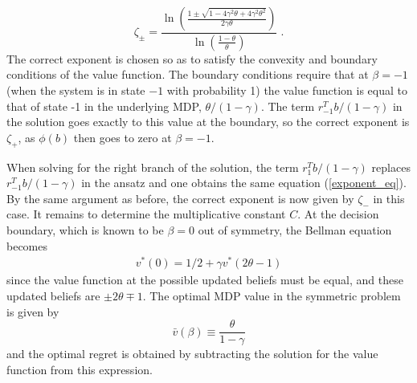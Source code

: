 \documentclass[aps,nofootinbib,groupaddress,superscriptaddress,reprint,amsmath,amssymb,graphicx,onecolumn,prx]{revtex4-2}
\begin{document}
\begin{equation}
    \zeta_{\pm}=\frac{\ln \left( \frac{1 \pm \sqrt{1 - 4\gamma^2\theta + 4\gamma^2\theta^2}}{2\gamma\theta} \right)}
{\ln(\frac{1 - \theta}{\theta})} \; .
\end{equation}
The correct exponent is chosen so as to satisfy the convexity and boundary conditions of the value function. The boundary conditions require that at $\beta=-1$ (when the system is in state $-1$ with probability 1) the value function is equal to that of state -1 in the underlying MDP, $\theta/(1-\gamma)$. The term $r_{-1}^Tb/(1-\gamma)$ in the solution goes exactly to this value at the boundary, so the correct exponent is $\zeta_+$, as $\phi(b)$ then goes to zero at $\beta=-1$.

When solving for the right branch of the solution, the term $r_1^Tb/(1-\gamma)$ replaces $r_{-1}^Tb/(1-\gamma)$ in the ansatz and one obtains the same equation (\ref{exponent_eq}). By the same argument as before, the correct exponent is now given by $\zeta_-$ in this case. It remains to determine the multiplicative constant $C$. At the decision boundary, which is known to be $\beta=0$ out of symmetry, the Bellman equation becomes
\begin{align}
    v^*(0)=1/2+\gamma v^*(2\theta-1)
\end{align}
since the value function at the possible updated beliefs must be equal, and these updated beliefs are $\pm 2\theta \mp1$. The optimal MDP value in the symmetric problem is given by
\begin{equation}
    \bar{v}(\beta)\equiv\frac{\theta}{1-\gamma}
\end{equation}
and the optimal regret is obtained by subtracting the solution for the value function from this expression. 
\end{document}
